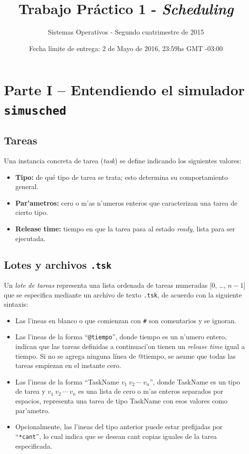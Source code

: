\documentclass[a4paper,11pt]{article}
\title{Trabajo Práctico 1 - \emph{Scheduling}}
\author{Sistemas Operativos - Segundo cuatrimestre de 2015}
\date{Fecha límite de entrega: 2 de Mayo de 2016, 23:59hs  GMT -03:00 }
\begin{document}
\renewcommand{\labelenumi}{\alph{enumi}$)$}
\maketitle

\section*{Parte I -- Entendiendo el simulador \texttt{simusched}}

\bigskip
\subsection*{Tareas}

Una instancia concreta de tarea (\emph{task}) se define indicando los siguientes valores:
\begin{itemize}
\item \textbf{Tipo:} de qué tipo de tarea se trata; esto determina su comportamiento general.
\item \textbf{Par'ametros:} cero o m'as n'umeros enteros que caracterizan una tarea de cierto tipo.
\item \textbf{Release time:} tiempo en que la tarea pasa al estado \emph{ready}, lista para ser ejecutada.

\end{itemize}


\subsection*{Lotes y archivos \texttt{.tsk}}

Un \emph{lote de tareas} representa una lista ordenada de tareas numeradas [0, \ldots, $n-1$] que
se especifica mediante un archivo de texto \texttt{.tsk}, de acuerdo con la siguiente sintaxis:
\begin{itemize}
        \item Las l'ineas en blanco o que comienzan con \texttt{\#} son comentarios y se ignoran.
        \item Las l'ineas de la forma ``\texttt{@\textsf{tiempo}}'', donde \textsf{tiempo} es un
        n'umero entero, indican que las tareas definidas a continuaci'on tienen un \emph{release time}
        igual a \textsf{tiempo}. Si no se agrega ninguna línea de \textsf{@tiempo}, se asume que todas las tareas empiezan en el instante cero.
        \item Las l'ineas de la forma ``\textsf{TaskName} $v_1\ v_2\ \cdots\ v_n$'', donde \textsf{TaskName}
        es un tipo de tarea y $v_1\ v_2\ \cdots\ v_n$ es una lista de cero o m'as enteros separados por espacios,
        representa una tarea de tipo \textsf{TaskName} con esos valores como par'ametro.
        \item Opcionalmente, las l'ineas del tipo anterior puede estar prefijadas por ``\texttt{*\textsf{cant}}'',
        lo cual indica que se desean \textsf{cant} copias iguales de la tarea especificada.
\end{itemize}
\end{document}
